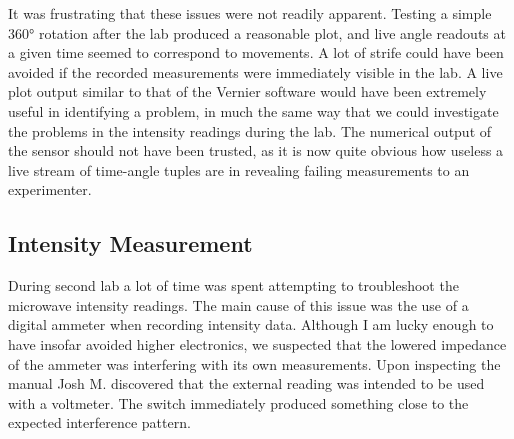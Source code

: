 It was frustrating that these issues were not readily apparent. Testing a simple 360° rotation after the lab produced a reasonable plot, and live angle readouts at a given time seemed to correspond to movements.
A lot of strife could have been avoided if the recorded measurements were immediately visible in the lab. A live plot output similar to that of the Vernier software would have been extremely useful in identifying a problem, in much the same way that we could investigate the problems in the intensity readings during the lab. The numerical output of the sensor should not have been trusted, as it is now quite obvious how useless a live stream of time-angle tuples are in revealing failing measurements to an experimenter.

\subsection*{Intensity Measurement}

During second lab a lot of time was spent attempting to troubleshoot the microwave intensity readings. The main cause of this issue was the use of a digital ammeter when recording intensity data. Although I am lucky enough to have insofar avoided higher electronics, we suspected that the lowered impedance of the ammeter was interfering with its own measurements. Upon inspecting the manual Josh M. discovered that the external reading was intended to be used with a voltmeter. The switch immediately produced something close to the expected interference pattern.




